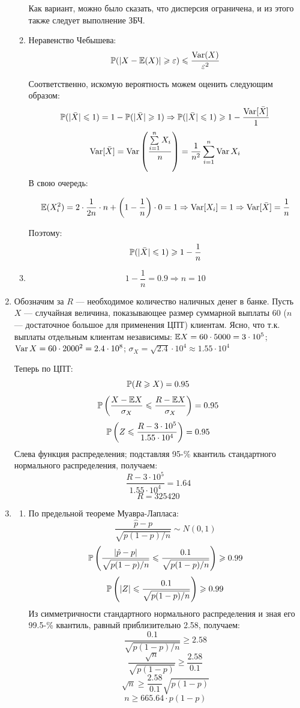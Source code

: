 \documentclass[12pt, a4paper]{article}\usepackage[]{graphicx}\usepackage[]{color}
\begin{document}
\begin{enumerate}
\begin{enumerate}
Как вариант, можно было сказать, что дисперсия ограничена, и из этого также следует выполнение ЗБЧ.
\item Неравенство Чебышева:
\[
\P(|X-\E(X)|\geqslant \varepsilon) \leqslant \frac{\Var(X)}{\varepsilon^2}
\]

Соответственно, искомую вероятность можем оценить следующим образом:
\[
\P(|\bar{X}| \leqslant 1) = 1 -\P(|\bar{X}| \geqslant 1) \Rightarrow \P(|\bar{X}| \leqslant 1) \geqslant 1 - \frac{\Var[\bar{X}]}{1}
\]
\[
\Var[\bar{X}] = \Var\left(\frac{\sum\limits_{i=1}^{n} X_i}{n}\right) = \frac{1}{n^2}\sum \limits_{i=1}^{n} \Var{X_i}
\]
В свою очередь:

\[
\E(X_i^2) = 2\cdot\frac{1}{2n}\cdot n + \left(1-\frac{1}{n}\right)\cdot0 = 1 \Rightarrow \Var[X_i] = 1 \Rightarrow \Var[\bar{X}] = \frac{1}{n}
\]

Поэтому:
\[
\P(|\bar{X}| \leqslant 1)\geqslant 1 - \frac{1}{n}
\]

\item  \[1 - \frac{1}{n} = 0.9  \Rightarrow n = 10\]

\end{enumerate}

\item

Обозначим за $R$ — необходимое количество наличных денег в банке. Пусть $X$ — случайная величина, показывающее размер суммарной выплаты $60$ ($n$ — достаточное большое для применения ЦПТ) клиентам. Ясно, что т.к. выплаты отдельным клиентам независимы: \( \E X = 60 \cdot 5000 = 3\cdot 10^5 \); \( \Var X = 60 \cdot 2000^2 = 2.4 \cdot 10^8 \); \( \sigma_X = \sqrt{2.4} \cdot 10^4 \approx 1.55 \cdot 10^4\)

Теперь по ЦПТ:
\[\P(R \geqslant X) = 0.95 \]
\[\P \left(\frac{X - \E X}{\sigma_X} \leqslant \frac{R - \E X}{\sigma_X} \right) = 0.95 \]
\[ \P \left( Z \leqslant \frac{R - 3 \cdot 10^5}{1.55 \cdot 10^4} \right) = 0.95 \]
Слева функция распределения; подставляя 95-\% квантиль стандартного нормального распределения, получаем:
\[ \frac{R - 3 \cdot 10^5}{1.55 \cdot 10^4} = 1.64 \]
\[ R = 325420 \]


\item

\begin{enumerate}
\item По предельной теореме Муавра-Лапласа:
\[ \frac{\hat{p} - p}{\sqrt{p(1-p)/n}} \sim N (0,1) \]
\[ \P \left( \frac{|\hat{p} - p|}{\sqrt{p(1-p)/n}} \leqslant \frac{0.1}{\sqrt{p(1-p)/n}} \right) \geqslant 0.99 \]
\[ \P \left( |Z| \leqslant \frac{0.1}{\sqrt{p(1-p)/n}} \right) \geqslant 0.99 \]
Из симметричности стандартного нормального распределения и зная его 99.5-\% квантиль, равный приблизительно 2.58, получаем:
\[ \frac{0.1}{\sqrt{p(1-p)/n}} \geqslant 2.58 \]
\[ \frac{\sqrt{n}}{\sqrt{p(1-p)}} \geqslant \frac{2.58}{0.1} \]
\[ \sqrt{n} \geqslant \frac{2.58}{0.1} \sqrt{p(1-p)} \]
\[ n \geqslant 665.64 \cdot p(1-p) \]


\end{enumerate}
\end{enumerate}
\end{document}
